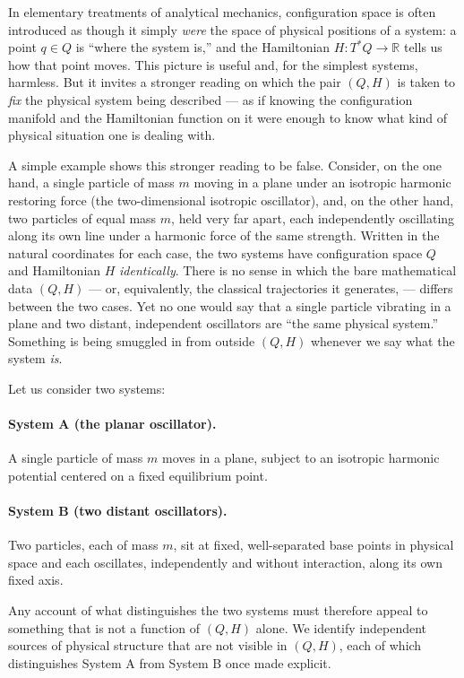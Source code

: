 In elementary treatments of analytical mechanics, configuration space is often
introduced as though it simply \emph{were} the space of physical positions of a
system: a point $q\in Q$ is ``where the system is,'' and the Hamiltonian
$H:T^*Q\to\mathbb{R}$ tells us how that point moves. This picture is useful
and, for the simplest systems, harmless. But it invites a stronger reading on
which the pair $(Q,H)$ is taken to \emph{fix} the physical system being
described --- as if knowing the configuration manifold and the Hamiltonian
function on it were enough to know what kind of physical situation one is
dealing with.

A simple example shows this stronger reading to be false. Consider, on the one
hand, a single particle of mass $m$ moving in a plane under an isotropic
harmonic restoring force (the two-dimensional isotropic oscillator), and, on
the other hand, two particles of equal mass $m$, held very far apart, each
independently oscillating along its own line under a harmonic force of the same
strength. Written in the natural coordinates for each case, the two systems
have configuration space $Q$ and Hamiltonian $H$
\emph{identically}. There is no sense in which the bare mathematical data
$(Q,H)$ --- or, equivalently, the classical trajectories it generates,
--- differs between the two cases. Yet no one would say that a
single particle vibrating in a plane and two distant, independent oscillators
are ``the same physical system.'' Something is being smuggled in from outside
$(Q,H)$ whenever we say what the system \emph{is}.

Let us consider two systems:

\paragraph{System A (the planar oscillator).} A single particle of mass $m$
moves in a plane, subject to an isotropic harmonic potential centered on a
fixed equilibrium point.

\paragraph{System B (two distant oscillators).} Two particles, each of mass
$m$, sit at fixed, well-separated base points in physical space and each
oscillates, independently and without interaction, along its own fixed axis.

Any account of what
distinguishes the two systems must therefore appeal to something that is not a
function of $(Q,H)$ alone.
We identify  independent sources of physical structure that are not
visible in $(Q,H)$, each of which distinguishes System A from System B once
made explicit.


